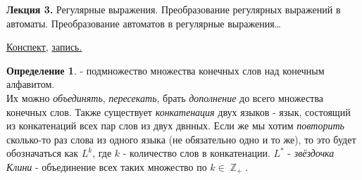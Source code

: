 \documentclass[a4paper]{article}
\newcommand{\mybox}{%
    \collectbox{%
        \setlength{\fboxsep}{1pt}%
        \fbox{\BOXCONTENT}%
    }%
}
\theoremstyle{indented}
\theoremstyle{definition}
\newtheorem{defn}{Определение}
\theoremstyle{remark}
\DeclareMathOperator{\ZZ}{\mathbb{Z}}
\begin{document}
\textbf{Лекция 3.} Регулярные выражения. Преобразование регулярных выражений в автоматы. Преобразование автоматов в регулярные выражения\ldots

\begin{flushright}
    \mybox{
        \href{https://users.math-cs.spbu.ru/~okhotin/teaching/tcs_fl_2021/okhotin_tcs_fl_2021_l3.pdf}{Конспект,}
        \href{https://disk.yandex.ru/d/knoQ44wLmGDwwQ/2021-2022%20учебный%20год%20(осенний%20семестр)/2%20курс/Теоретическая%20информатика/Теоретическая%20информатика%2C%20лекция%2C%2015.09.2021.mp4}{запись.}
    }
\end{flushright}

\begin{defn}
     - подмножество множества конечных слов над конечным алфавитом. \\ 

    Их можно \textit{объединять}, \textit{пересекать}, брать \textit{дополнение} до всего множества конечных слов. Также существует \textit{конкатенация} двух языков - язык, состоящий из конкатенаций всех пар слов из двух двнных. Если же мы хотим \textit{повторить} сколько-то раз слова из одного языка (не обязательно одно и то же), то это будет обозначаться как $L^k$, где $k$ - количество слов в конкатенации. $L^*$ - \textit{звёздочка Клини} - объединение всех таких множество по $k \in \ZZ_+$.
\end{defn}
\end{document}
